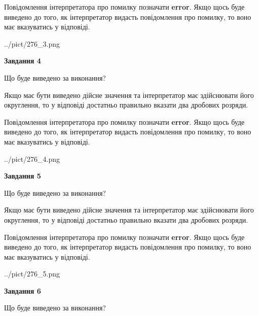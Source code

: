 \documentclass[12pt, ukrainian]{article}
\begin{document}
{\begin {Large}
Повідомлення інтерпретатора про помилку позначати \textbf{error}.
Якщо щось буде виведено до того, як інтерпретатор видасть повідомлення про помилку, 
то воно має вказуватись у відповіді. \par

\begin{center}
	{../pict/276_3.png}
\end{center}
\newpage

{\begin {center}\textbf{Завдання 4}\end {center}}\par
Що буде виведено за виконання? \par

Якщо має бути виведено дійсне значення та інтерпретатор має здійснювати його округлення, 
то у відповіді достатньо правильно вказати два дробових розряди.

Повідомлення інтерпретатора про помилку позначати \textbf{error}.
Якщо щось буде виведено до того, як інтерпретатор видасть повідомлення про помилку, 
то воно має вказуватись у відповіді. \par

\begin{center}
	{../pict/276_4.png}
\end{center}
\newpage

{\begin {center}\textbf{Завдання 5}\end {center}}\par
Що буде виведено за виконання? \par

Якщо має бути виведено дійсне значення та інтерпретатор має здійснювати його округлення, 
то у відповіді достатньо правильно вказати два дробових розряди.

Повідомлення інтерпретатора про помилку позначати \textbf{error}.
Якщо щось буде виведено до того, як інтерпретатор видасть повідомлення про помилку, 
то воно має вказуватись у відповіді. \par

\begin{center}
	{../pict/276_5.png}
\end{center}
\newpage

{\begin {center}\textbf{Завдання 6}\end {center}}\par
Що буде виведено за виконання? \par


\end{Large}}
\end{document}
